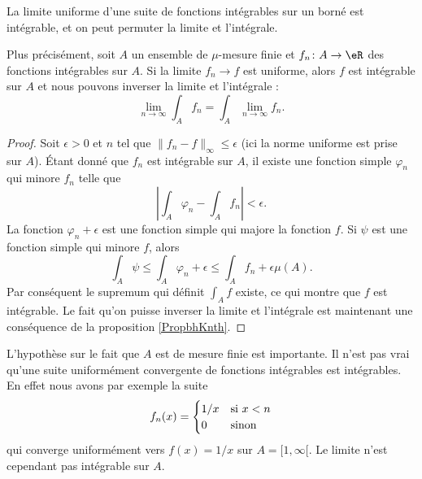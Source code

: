 \begin{theorem}			\label{ThoUnifCvIntRiem}
    La limite uniforme d'une suite de fonctions intégrables sur un borné est intégrable, et on peut permuter la limite et l'intégrale. 
    
    Plus précisément, soit \( A\) un ensemble de \( \mu\)-mesure finie et \( f_n\colon A\to \eR\) des fonctions intégrables sur \( A\). Si la limite \( f_n\to f\) est uniforme, alors \( f\) est intégrable sur \( A\) et nous pouvons inverser la limite et l'intégrale :
    \begin{equation}
        \lim_{n\to \infty} \int_A f_n=\int_A\lim_{n\to \infty} f_n.
    \end{equation}
\end{theorem}

\begin{proof}
    Soit \( \epsilon>0\) et \( n\) tel que \( \| f_n-f \|_{\infty}\leq \epsilon\) (ici la norme uniforme est prise sur \( A\)). Étant donné que \( f_n\) est intégrable sur \( A\), il existe une fonction simple \( \varphi_n\) qui minore \( f_n\) telle que
    \begin{equation}
        \left| \int_{A}\varphi_n-\int_A f_n \right| <\epsilon.
    \end{equation}
    La fonction \( \varphi_n+\epsilon\) est une fonction simple qui majore la fonction \( f\). Si \( \psi\) est une fonction simple qui minore \( f\), alors
    \begin{equation}
        \int_A\psi\leq\int_A\varphi_n+\epsilon\leq\int_A f_n+\epsilon\mu(A).
    \end{equation}
    Par conséquent le supremum qui définit \( \int_A f\) existe, ce qui montre que \( f\) est intégrable. Le fait qu'on puisse inverser la limite et l'intégrale est maintenant une conséquence de la proposition \ref{PropbhKnth}.
\end{proof}

\begin{remark}
    L'hypothèse sur le fait que \( A\) est de mesure finie est importante. Il n'est pas vrai qu'une suite uniformément convergente de fonctions intégrables est intégrables. En effet nous avons par exemple la suite
    \begin{equation}
        f_n(x)=\begin{cases}
            1/x    &   \text{si \( x<n\)}\\
            0    &    \text{sinon}
        \end{cases}
    \end{equation}
    qui converge uniformément vers \( f(x)=1/x\) sur \( A=\mathopen[ 1 , \infty [\). Le limite n'est cependant pas intégrable sur \( A\).
\end{remark}

